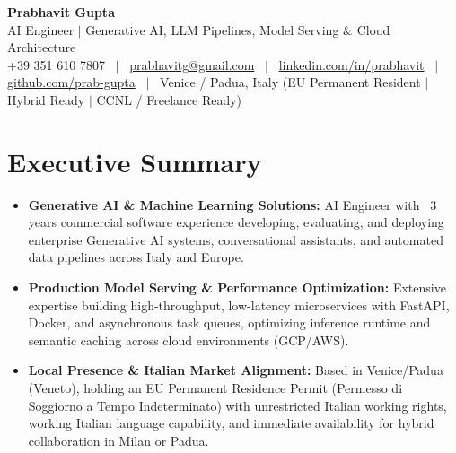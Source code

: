 \documentclass[a4paper,10pt]{article}
\begin{document}
\begin{minipage}[c]{0.80\textwidth}
  {\Huge\bfseries Prabhavit Gupta}\\[3pt]
  {\color{accent}\large AI Engineer $\vert$ Generative AI, LLM Pipelines, Model Serving $\&$ Cloud Architecture}\\[6pt]
  {\footnotesize +39 351 610 7807 ~$\vert$~
  \href{mailto:prabhavitg@gmail.com}{prabhavitg@gmail.com} ~$\vert$~
  \href{https://www.linkedin.com/in/prabhavit/}{linkedin.com/in/prabhavit} ~$\vert$~
  \href{https://github.com/prab-gupta}{github.com/prab-gupta} ~$\vert$~
  Venice / Padua, Italy (EU Permanent Resident $\vert$ Hybrid Ready $\vert$ CCNL / Freelance Ready)}
\end{minipage}\hfill

\vspace{6pt}

\section{Executive Summary}
\begin{itemize}
  \item \textbf{Generative AI \& Machine Learning Solutions:} AI Engineer with ~3 years commercial software experience developing, evaluating, and deploying enterprise Generative AI systems, conversational assistants, and automated data pipelines across Italy and Europe.
  \item \textbf{Production Model Serving \& Performance Optimization:} Extensive expertise building high-throughput, low-latency microservices with FastAPI, Docker, and asynchronous task queues, optimizing inference runtime and semantic caching across cloud environments (GCP/AWS).
  \item \textbf{Local Presence \& Italian Market Alignment:} Based in Venice/Padua (Veneto), holding an EU Permanent Residence Permit (Permesso di Soggiorno a Tempo Indeterminato) with unrestricted Italian working rights, working Italian language capability, and immediate availability for hybrid collaboration in Milan or Padua.
\end{itemize}

\end{document}
